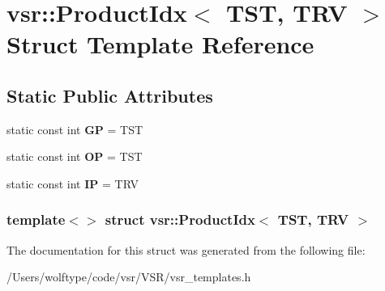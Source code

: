 \hypertarget{structvsr_1_1_product_idx_3_01_t_s_t_00_01_t_r_v_01_4}{\section{vsr\-:\-:Product\-Idx$<$ T\-S\-T, T\-R\-V $>$ Struct Template Reference}
\label{structvsr_1_1_product_idx_3_01_t_s_t_00_01_t_r_v_01_4}
}
\subsection*{Static Public Attributes}
\begin{DoxyCompactItemize}
\item 
\hypertarget{structvsr_1_1_product_idx_3_01_t_s_t_00_01_t_r_v_01_4_a8026ecfcd6674ed7ab26918c1e8d0959}{static const int {\bfseries G\-P} = T\-S\-T}\label{structvsr_1_1_product_idx_3_01_t_s_t_00_01_t_r_v_01_4_a8026ecfcd6674ed7ab26918c1e8d0959}

\item 
\hypertarget{structvsr_1_1_product_idx_3_01_t_s_t_00_01_t_r_v_01_4_a720480e276cc3a52ba636c9ec2984311}{static const int {\bfseries O\-P} = T\-S\-T}\label{structvsr_1_1_product_idx_3_01_t_s_t_00_01_t_r_v_01_4_a720480e276cc3a52ba636c9ec2984311}

\item 
\hypertarget{structvsr_1_1_product_idx_3_01_t_s_t_00_01_t_r_v_01_4_a8e56cb60b1c6728cf3c06979900e49fe}{static const int {\bfseries I\-P} = T\-R\-V}\label{structvsr_1_1_product_idx_3_01_t_s_t_00_01_t_r_v_01_4_a8e56cb60b1c6728cf3c06979900e49fe}

\end{DoxyCompactItemize}
\subsubsection*{template$<$$>$ struct vsr\-::\-Product\-Idx$<$ T\-S\-T, T\-R\-V $>$}



The documentation for this struct was generated from the following file\-:\begin{DoxyCompactItemize}
\item 
/\-Users/wolftype/code/vsr/\-V\-S\-R/vsr\-\_\-templates.\-h\end{DoxyCompactItemize}
